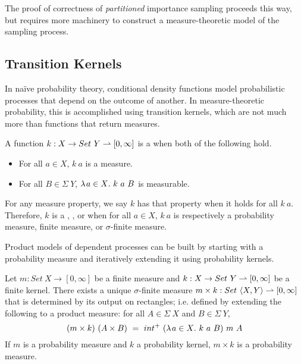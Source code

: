 The proof of correctness of \emph{partitioned} importance sampling proceeds this way, but requires more machinery to construct a measure-theoretic model of the sampling process.

\subsection{Transition Kernels}

In na\"ive probability theory, conditional density functions model probabilistic processes that depend on the outcome of another.
In measure-theoretic probability, this is accomplished using transition kernels, which are not much more than functions that return measures.

\begin{definition}
\label{def:transition-kernel}
A function $k : X \to Set~Y \rightharpoonup [0,\infty]$ is a  when both of the following hold.
\begin{itemize}
	\item For all $a \in X$, $k~a$ is a measure.
	\item For all $B \in \Sigma~Y$, $\lambda\mspace{2mu}{a \in X}\ldotp\, k~a~B$ is measurable.
\end{itemize}
\end{definition}

For any measure property, we say $k$ has that property when it holds for all $k~a$.
Therefore, $k$ is a , , or  when for all $a \in X$, $k~a$ is respectively a probability measure, finite measure, or $\sigma$-finite measure.

Product models of dependent processes can be built by starting with a probability measure and iteratively extending it using probability kernels.

\begin{lemma}
\label{lem:finite-transition-kernel-products}
Let $m : Set~X \to [0,\infty]$ be a finite measure and $k : X \to Set~Y \rightharpoonup [0,\infty]$ be a finite kernel.
There exists a unique $\sigma$-finite measure $m \times k : Set~\langle{X,Y}\rangle \rightharpoonup [0,\infty]$ that is determined by its output on rectangles; i.e. defined by extending the following to a product measure: for all $A \in \Sigma~X$ and $B \in \Sigma~Y$,
\begin{equation}
	(m \times k)~(A \times B)\ =\ int^+~(\lambda\mspace{2mu}{a \in X}\ldotp\, k~a~B)~m~A
\end{equation}
If $m$ is a probability measure and $k$ a probability kernel, $m \times k$ is a probability measure.
\end{lemma}

